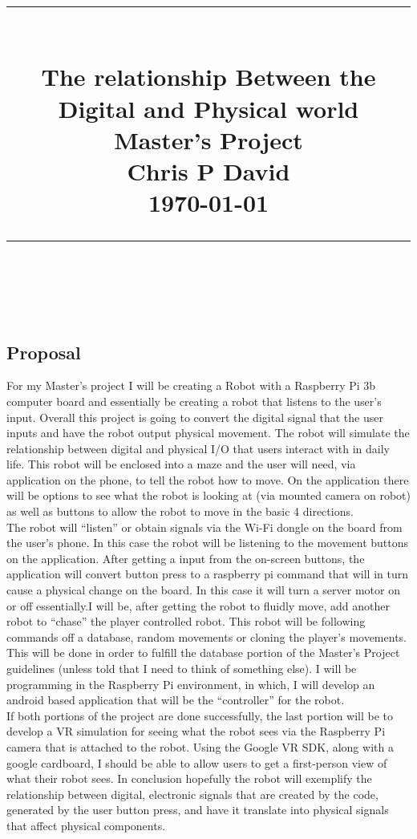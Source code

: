 \documentclass[13ptletterpaper]{paper}
\title{
	\begin{center}
		\normalfont \normalsize
		\rule{\linewidth}{.5pt} \\[0.4cm] 
		\huge {The relationship Between the Digital and Physical world} \\ 
		\large {Master's Project}\\
		\small{Chris P David}\\
		{\today}\\
		\rule{\linewidth}{.5pt} \\
	\end{center}
}
\newcommand\tab[1][1cm]{\hspace*{#1}}
\begin{document}
	\begin{titlepage}
		\clearpage
		\maketitle
		\thispagestyle{empty}
	\end{titlepage}
	\pagebreak	
	\tableofcontents
	
	\begin{flushleft}
		\pagebreak
		\section{Proposal}
		\tab For my Master’s project I will be creating a Robot with a Raspberry Pi 3b computer	board and essentially be creating a robot that listens to the user’s input. Overall this project is going to convert the digital signal that the user inputs and have the robot output physical movement. The robot will simulate the relationship between digital and physical I/O that users interact with in daily life. This robot will be enclosed into a maze and the user will need, via application on the phone, to tell the robot how to move. On the application there will be options to see what the	robot is looking at (via mounted camera on robot) as well as buttons to allow the robot to move	in the basic 4 directions.	\\
		\tab The robot will “listen” or obtain signals via the Wi-Fi dongle on the board from the user’s phone. In this case the robot will be listening to the movement buttons on the application. After getting a input from the on-screen buttons, the application will convert button press to a raspberry pi command that will in turn cause a physical change on the board. In this case it will turn a server motor on or off essentially.I will be, after getting the robot to fluidly move, add another robot to “chase” the player controlled robot. This robot will be following commands off a database, random movements or	cloning the player’s movements. This will be done in order to fulfill the database portion of the Master’s Project guidelines (unless told that I need to think of something else). I will be programming in the Raspberry Pi environment, in which, I will develop an android based application that will be the “controller” for the robot. \\
		\tab If both portions of the project are done successfully, the last portion will be to develop a	VR simulation for seeing what the robot sees via the Raspberry Pi camera that is attached to the robot. Using the Google VR SDK, along with a google cardboard, I should be able to allow users	to get a first-person view of what their robot sees. In conclusion hopefully the robot will exemplify the relationship between digital, electronic signals that are created by the code, generated by the user button press, and have it translate into physical signals that affect physical components.

\end{flushleft}
\end{document}
